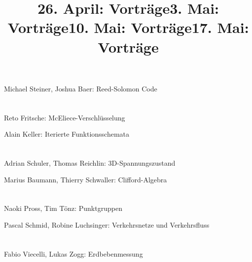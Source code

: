 \documentclass[aspectratio=169]{beamer}
\author[]{}
\begin{document}
\title[Vorträge]{26. April: Vorträge}
\begin{frame}
\titlepage
\vspace{-2cm}
\begin{center}
Michael Steiner, Joshua Baer: Reed-Solomon Code
\phantom{blubb} \\
\phantom{blubb} \\
\phantom{blubb} \\
Reto Fritsche: McEliece-Verschlüsselung
\end{center}
\end{frame}

\title[Vorträge]{3. Mai: Vorträge}
\begin{frame}
\titlepage
\vspace{-2cm}
\begin{center}
Alain Keller: Iterierte Funktionsschemata
\phantom{blubb} \\
\phantom{blubb} \\
\phantom{blubb} \\
Adrian Schuler, Thomas Reichlin: 3D-Spannungszustand
\end{center}
\end{frame}

\title[Vorträge]{10. Mai: Vorträge}
\begin{frame}
\titlepage
\vspace{-2cm}
\begin{center}
Marius Baumann, Thierry Schwaller: Clifford-Algebra
\phantom{blubb} \\
\phantom{blubb} \\
\phantom{blubb} \\
Naoki Pross, Tim Tönz: Punktgruppen
\end{center}
\end{frame}

\title[Vorträge]{17. Mai: Vorträge}
\begin{frame}
\titlepage
\vspace{-2cm}
\begin{center}
Pascal Schmid, Robine Luchsinger: Verkehrsnetze und Verkehrsfluss
\phantom{blubb} \\
\phantom{blubb} \\
\phantom{blubb} \\
Fabio Viecelli, Lukas Zogg: Erdbebenmessung
\end{center}
\end{frame}


\end{document}
